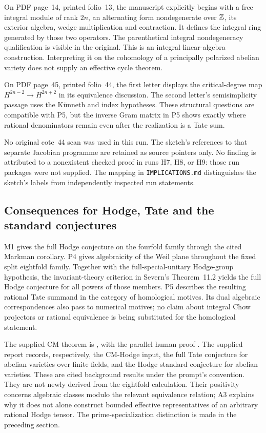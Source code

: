 On PDF page~14, printed folio~13, the manuscript explicitly begins with a free integral module of rank $2n$, an alternating form nondegenerate over $\mathbb Z$, its exterior algebra, wedge multiplication and contraction. It defines the integral ring generated by those two operators. The parenthetical integral nondegeneracy qualification is visible in the original. This is an integral linear-algebra construction. Interpreting it on the cohomology of a principally polarized abelian variety does not supply an effective cycle theorem.

On PDF page~45, printed folio~44, the first letter displays the critical-degree map $H^{2n-2}\to H^{2n+2}$ in its equivalence discussion. The second letter's semisimplicity passage uses the K\"unneth and index hypotheses. These structural questions are compatible with P5, but the inverse Gram matrix in P5 shows exactly where rational denominators remain even after the realization is a Tate sum.

No original cote~44 scan was used in this run. The sketch's references to that separate Jacobian programme are retained as source pointers only. No finding is attributed to a nonexistent checked proof in runs H7, H8, or H9: those run packages were not supplied. The mapping in \texttt{IMPLICATIONS.md} distinguishes the sketch's labels from independently inspected run statements.

\subsection*{Consequences for Hodge, Tate and the standard conjectures}
M1 gives the full Hodge conjecture on the fourfold family through the cited Markman corollary. P4 gives algebraicity of the Weil plane throughout the fixed split eightfold family. Together with the full-special-unitary Hodge-group hypothesis, the invariant-theory criterion in Severn's Theorem~11.2 yields the full Hodge conjecture for all powers of those members. P5 describes the resulting rational Tate summand in the category of homological motives. Its dual algebraic correspondences also pass to numerical motives; no claim about integral Chow projectors or rational equivalence is being substituted for the homological statement.

The supplied CM theorem is \citet[Theorem~1.1]{OpenAI26}, with the parallel human proof \citet[Theorem~I]{vanHoften26}. The supplied report \citet[Theorems~2.1, 3.1, and~3.5]{Milne26} records, respectively, the CM-Hodge input, the full Tate conjecture for abelian varieties over finite fields, and the Hodge standard conjecture for abelian varieties. These are cited background results under the prompt's convention. They are not newly derived from the eightfold calculation. Their positivity concerns algebraic classes modulo the relevant equivalence relation; A3 explains why it does not alone construct bounded effective representatives of an arbitrary rational Hodge tensor. The prime-specialization distinction is made in the preceding section.
